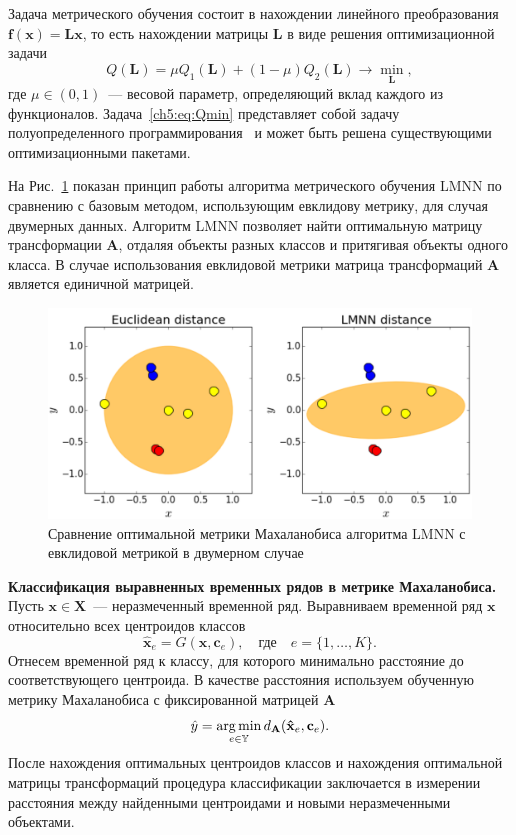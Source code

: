 Задача метрического обучения состоит в нахождении линейного преобразования $\mathbf{f}(\mathbf{x}) = \mathbf{Lx}$, то есть нахождении матрицы $\mathbf{L}$ в виде решения оптимизационной задачи
\begin{equation}
	\label{ch5:eq:Qmin}
	Q(\mathbf{L}) = \mu Q_1(\mathbf{L}) + (1 - \mu) Q_2(\mathbf{L}) \rightarrow \min_{\mathbf{L}},
\end{equation}
где $\mu \in (0, 1)$~--- весовой параметр, определяющий вклад каждого из функционалов.
Задача~\eqref{ch5:eq:Qmin} представляет собой задачу полуопределенного программирования~\cite{vandenberghe1996semidefinite} и может быть решена существующими оптимизационными пакетами.

На Рис.~\ref{ch5:fig:metric_learning_toy_example} показан принцип работы алгоритма метрического обучения LMNN по сравнению с базовым методом, использующим евклидову метрику, для случая двумерных данных. 
Алгоритм LMNN позволяет найти оптимальную матрицу трансформации $\mathbf{A}$, отдаляя объекты разных классов и притягивая объекты одного класса. 
В случае использования евклидовой метрики матрица трансформаций $\mathbf{A}$ является единичной матрицей.

\begin{figure}[ht]
	\centering
	\includegraphics[width=0.9\linewidth]{figs/ch5/metric_learning_toy_example}
	\caption{Сравнение оптимальной метрики Махаланобиса алгоритма LMNN с евклидовой метрикой в двумерном случае}
	\label{ch5:fig:metric_learning_toy_example}
\end{figure}

\textbf{Классификация выравненных временных рядов в метрике Махаланобиса.}
Пусть $\mathbf{x} \in \mathbf{X}$~--- неразмеченный временной ряд. Выравниваем временной ряд $\mathbf{x}$ относительно всех центроидов классов
\[
	\mathbf{\hat{x}}_e = G(\mathbf{x}, \mathbf{c}_e), \quad \text{где} \quad e = \{1, \dots, K\}.
\]
Отнесем временной ряд к классу, для которого минимально расстояние до соответствующего центроида. В качестве расстояния используем обученную метрику Махаланобиса с фиксированной матрицей $\mathbf{A}$
\[
	\hat{y} = \mathop{\arg \min}\limits_{e \in \mathbb{Y}} d_\mathbf{A}(\mathbf{\hat{x}}_e, \mathbf{c}_e).
\]
После нахождения оптимальных центроидов классов и нахождения оптимальной матрицы трансформаций процедура классификации заключается в измерении расстояния между найденными центроидами и новыми неразмеченными объектами.

